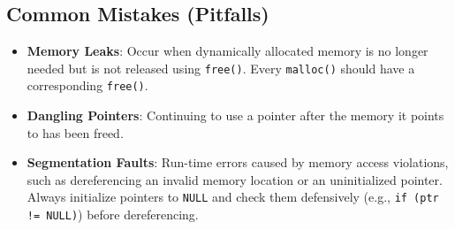 \subsection{Common Mistakes (Pitfalls)}
\begin{remark}
\begin{itemize}
    \item \textbf{Memory Leaks}: Occur when dynamically allocated memory is no longer needed but is not released using \texttt{free()}. Every \texttt{malloc()} should have a corresponding \texttt{free()}.
    \item \textbf{Dangling Pointers}: Continuing to use a pointer after the memory it points to has been freed.
    \item \textbf{Segmentation Faults}: Run-time errors caused by memory access violations, such as dereferencing an invalid memory location or an uninitialized pointer. Always initialize pointers to \texttt{NULL} and check them defensively (e.g., \texttt{if (ptr != NULL)}) before dereferencing.
\end{itemize}
\end{remark}
